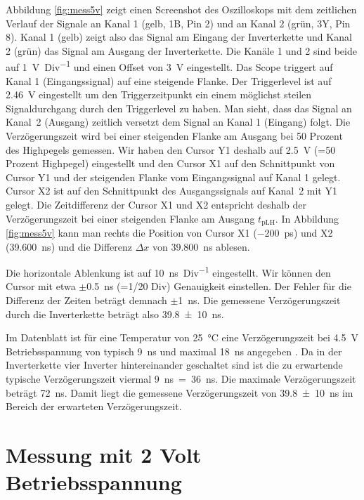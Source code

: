 \documentclass[paper=a4,oneside,abstract,DIV=19,parskip=half]{scrartcl}
\begin{document}
Abbildung \ref{fig:mess5v} zeigt einen Screenshot des Oszilloskops mit dem zeitlichen Verlauf der Signale an Kanal 1 (gelb, 1B, Pin 2) und an Kanal 2 (grün, 3Y, Pin 8). Kanal 1 (gelb) zeigt also das Signal am Eingang der Inverterkette und Kanal 2 (grün) das Signal am Ausgang der Inverterkette. Die Kanäle 1 und 2 sind beide auf \SI{1}{\V\per Div} und einen Offset von \SI{3}{\V} eingestellt. Das Scope triggert auf Kanal 1 (Eingangssignal) auf eine steigende Flanke. Der Triggerlevel ist auf \SI{2,46}{\V} eingestellt um den Triggerzeitpunkt ein einem möglichst steilen Signaldurchgang durch den Triggerlevel zu haben. Man sieht, dass das Signal an Kanal~2 (Ausgang) zeitlich versetzt dem Signal an Kanal 1 (Eingang) folgt. Die Verzögerungszeit wird bei einer steigenden Flanke am Ausgang bei 50 Prozent des Highpegels gemessen. Wir haben den Cursor Y1 deshalb auf \SI{2,5}{\V} (=50 Prozent Highpegel) eingestellt und den Cursor X1 auf den Schnittpunkt von Cursor Y1 und der steigenden Flanke vom Eingangssignal auf Kanal 1 gelegt. Cursor X2 ist auf den Schnittpunkt des Ausgangssignals auf Kanal~2 mit Y1 gelegt. Die Zeitdifferenz der Cursor X1 und X2 entspricht deshalb der Verzögerungszeit bei einer steigenden Flanke am Ausgang $t_{\textrm{pLH}}$. In Abbildung \ref{fig:mess5v} kann man rechts die Position von Cursor X1 (\SI{-200}{\ps}) und X2 (\SI{39,600}{\ns}) und die Differenz $\Delta x$ von \SI{39,800}{\ns} ablesen. 

Die horizontale Ablenkung ist auf \SI{10}{\ns\per Div} eingestellt. Wir können den Cursor mit etwa $\pm$\SI{0,5}{\ns} (=1/20 Div) Genauigkeit einstellen. Der Fehler für die Differenz der Zeiten beträgt demnach $\pm$\SI{1}{\ns}. Die gemessene Verzögerungszeit durch die Inverterkette beträgt also \SI{39,8(10)}{\ns}.

Im Datenblatt ist für eine Temperatur von \SI{25}{\celsius} eine Verzögerungszeit bei \SI{4,5}{\V} Betriebsspannung von typisch \SI{9}{\ns} und maximal \SI{18}{\ns} angegeben \cite[Kapitel 6.7 Switching Characteristics - Commercial]{ti74hc00}. Da in der Inverterkette vier Inverter hintereinander geschaltet sind ist die zu erwartende typische Verzögerungszeit viermal \SI{9}{\ns}~=~\SI{36}{\ns}. Die maximale Verzögerungszeit beträgt \SI{72}{\ns}. Damit liegt die gemessene Verzögerungszeit von \SI{39,8(10)}{\ns} im Bereich der erwarteten Verzögerungszeit.

\section{Messung mit 2 Volt Betriebsspannung}
\end{document}
